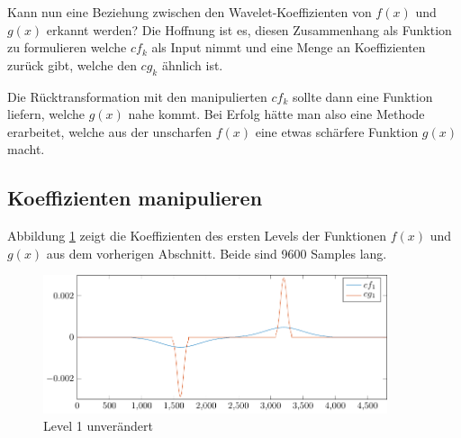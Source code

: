 Kann nun eine Beziehung zwischen den Wavelet-Koeffizienten von $f(x)$ und $g(x)$ erkannt werden?
Die Hoffnung ist es, diesen Zusammenhang als Funktion zu formulieren welche $cf_k$ als Input nimmt und eine Menge an Koeffizienten zurück gibt, welche den $cg_k$ ähnlich ist.

Die Rücktransformation mit den manipulierten $cf_k$ sollte dann eine Funktion liefern, welche $g(x)$ nahe kommt.
Bei Erfolg hätte man also eine Methode erarbeitet, welche aus der \glqq unscharfen\grqq{} $f(x)$ eine etwas \glqq schärfere\grqq{} Funktion $g(x)$ macht. 

\subsection{Koeffizienten manipulieren}
Abbildung \ref{deconvolve:level1} zeigt die Koeffizienten des ersten Levels der Funktionen $f(x)$ und $g(x)$ aus dem vorherigen Abschnitt.
Beide sind 9600 Samples lang.
\begin{figure}[h]
\centering
\includegraphics[width=0.9\textwidth]{./papers/deconvolve/pictures/level/level1.pdf}
\caption{Level 1 unverändert\label{deconvolve:level1}}
\end{figure}


